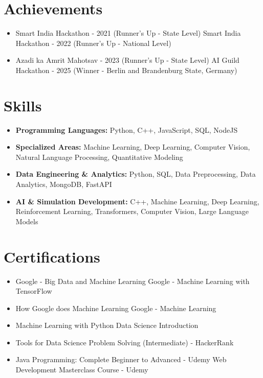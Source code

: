 \documentclass[a4paper,10pt]{article}
\begin{document}
\section*{Achievements}
\begin{itemize}
\item Smart India Hackathon - 2021 (Runner's Up - State Level) \hfill Smart India Hackathon - 2022 (Runner's Up - National Level)
\item Azadi ka Amrit Mahotsav - 2023 (Runner's Up - State Level) \hfill AI Guild Hackathon - 2025 (Winner - Berlin and Brandenburg State, Germany)
\end{itemize}

\section*{Skills}
\begin{itemize}
  \item \textbf{Programming Languages:} Python, C++, JavaScript, SQL, NodeJS
  \item \textbf{Specialized Areas:} Machine Learning, Deep Learning, Computer Vision, Natural Language Processing, Quantitative Modeling
  \item \textbf{Data Engineering \& Analytics:} Python, SQL, Data Preprocessing, Data Analytics, MongoDB, FastAPI
  \item \textbf{AI \& Simulation Development:} C++, Machine Learning, Deep Learning, Reinforcement Learning, Transformers, Computer Vision, Large Language Models
\end{itemize}

\section*{Certifications}
\begin{itemize}
\item Google - Big Data and Machine Learning \hfill Google - Machine Learning with TensorFlow
\item How Google does Machine Learning \hfill Google - Machine Learning
\item Machine Learning with Python \hfill Data Science Introduction
\item Tools for Data Science \hfill Problem Solving (Intermediate) - HackerRank
\item Java Programming: Complete Beginner to Advanced - Udemy \hfill Web Development Masterclass Course - Udemy
\end{itemize}
\end{document}
